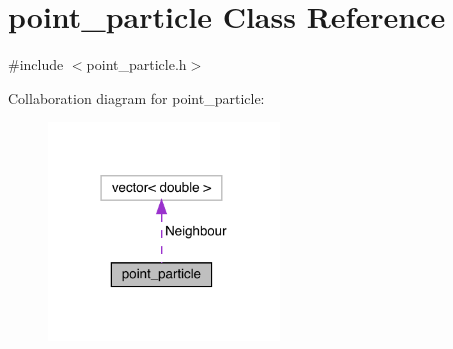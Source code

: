 \hypertarget{classpoint__particle}{}\section{point\+\_\+particle Class Reference}
\label{classpoint__particle}


{\ttfamily \#include $<$point\+\_\+particle.\+h$>$}



Collaboration diagram for point\+\_\+particle\+:
\nopagebreak
\begin{figure}[H]
\begin{center}
\leavevmode
\includegraphics[width=174pt]{classpoint__particle__coll__graph}
\end{center}
\end{figure}
